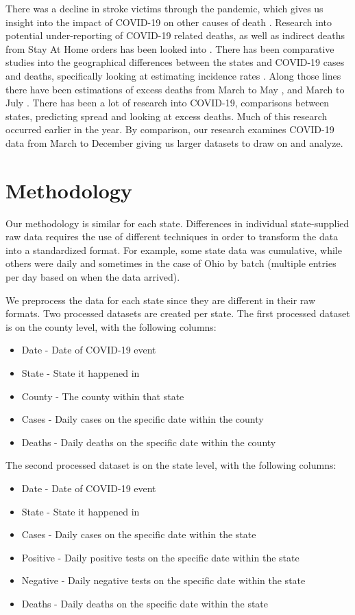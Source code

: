 \documentclass[conference]{IEEEtran}
\begin{document}
There was a decline in stroke victims through the pandemic, which gives us insight into the impact of COVID-19 on other causes of death \cite{uchino_decline_2020}.
Research into potential under-reporting of COVID-19 related deaths, as well as indirect deaths from Stay At Home orders has been looked into \cite{woolf_excess_2020}.
There has been comparative studies into the geographical differences between the states and COVID-19 cases and deaths, specifically looking at estimating incidence rates \cite{cdc_covid-19_response_team_geographic_2020}. 
Along those lines there have been estimations of excess deaths from March to May \cite{weinberger_estimation_2020}, and March to July \cite{woolf_excess_2020-1}.
There has been a lot of research into COVID-19, comparisons between states, predicting spread and looking at excess deaths. 
Much of this research occurred earlier in the year. By comparison, our research examines COVID-19 data from March to December giving us larger datasets to draw on and analyze.

\section{Methodology}

Our methodology is similar for each state. Differences in individual state-supplied raw data requires the use of different techniques in order to transform the data into a standardized format.
For example, some state data was cumulative, while others were daily and sometimes in the case of Ohio by batch (multiple entries per day based on when the data arrived).

We preprocess the data for each state since they are different in their raw formats.
Two processed datasets are created per state.
The first processed dataset is on the county level, with the following columns:
\begin{itemize}
  \item Date - Date of COVID-19 event
  \item State - State it happened in
  \item County - The county within that state
  \item Cases - Daily cases on the specific date within the county
  \item Deaths - Daily deaths on the specific date within the county
\end{itemize}

The second processed dataset is on the state level, with the following columns:
\begin{itemize}
  \item Date - Date of COVID-19 event
  \item State - State it happened in
  \item Cases - Daily cases on the specific date within the state
  \item Positive - Daily positive tests on the specific date within the state
  \item Negative - Daily negative tests on the specific date within the state
  \item Deaths - Daily deaths on the specific date within the state
\end{itemize}
\end{document}
